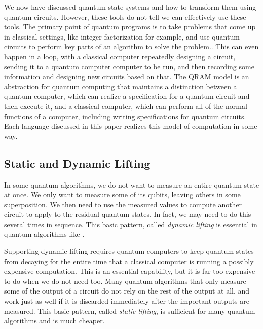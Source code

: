 We now have discussed quantum state systems and how to transform them using quantum circuits.
However, these tools do not tell we can effectively use these tools.
The primary point of quantum programs is to take problems that come up in classical settings, like integer factorization for example, and use quantum circuits to perform key parts of an algorithm to solve the problem..
This can even happen in a loop, with a classical computer repeatedly designing a circuit, sending it to a quantum computer computer to be run, and then recording some information and designing new circuits based on that.
The QRAM model is an abstraction for quantum computing that maintains a distinction between a quantum computer, which can realize a specification for a quantum circuit and then execute it, and a classical computer, which can perform all of the normal functions of a computer, including writing specifications for quantum circuits.
Each language discussed in this paper realizes this model of computation in some way.

\subsection{Static and Dynamic Lifting}

In some quantum algorithms, we do not want to measure an entire quantum state at once.
We only want to measure some of its qubits, leaving others in some superposition.
We then need to use the measured values to compute another circuit to apply to the residual quantum states.
In fact, we may need to do this several times in sequence.
This basic pattern, called \emph{dynamic lifting} is essential in quantum algorithms like .

Supporting dynamic lifting requires quantum computers to keep quantum states from decaying for the entire time that a classical computer is running a possibly expensive computation. 
This is an essential capability, but it is far too expensive to do when we do not need too.
Many quantum algorithms that only measure some of the output of a circuit do not rely on the rest of the output at all, and work just as well if it is discarded immediately after the important outputs are measured.
This basic pattern, called \emph{static lifting}, is sufficient for many quantum algorithms and is much cheaper.

